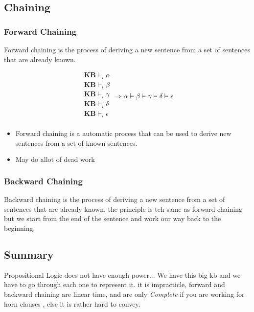 \documentclass{article}
\theoremstyle{mytheoremstyle}
\theoremstyle{mytheoremstyle}
\theoremstyle{myproblemstyle}
\begin{document}
\subsection{Chaining}
\subsubsection{Forward Chaining}
Forward chaining is the process of deriving a new sentence from a set of sentences that are already known.
\begin{theorem}
	\begin{displaymath}
		\begin{array}{l}
			\textbf{KB} \vdash_i \alpha   \\
			\textbf{KB} \vdash_i \beta    \\
			\textbf{KB} \vdash_i \gamma   \\
			\textbf{KB} \vdash_i \delta   \\
			\textbf{KB} \vdash_i \epsilon \\
		\end{array}
		\Rightarrow \alpha \models \beta \models \gamma \models \delta \models \epsilon
	\end{displaymath}
\end{theorem}

\begin{itemize}
	\item Forward chaining is a automatic process that can be used to derive new sentences from a set of known sentences.
	\item May do allot of dead work
\end{itemize}
\subsubsection{Backward Chaining}
Backward chaining is the process of deriving a new sentence from a set of sentences that are already known.
the principle is teh same as forward chaining but we start from the end of the sentence and work our way back to the beginning.

\subsection{Summary}
Propositional Logic does not have enough power...
We have this big kb and we have to go through each one to represent it. it is impracticle, forward and backward chaining are linear time, and are only \textit{Complete} if you are working for horn clauses , else it is rather hard to convey.
\end{document}
